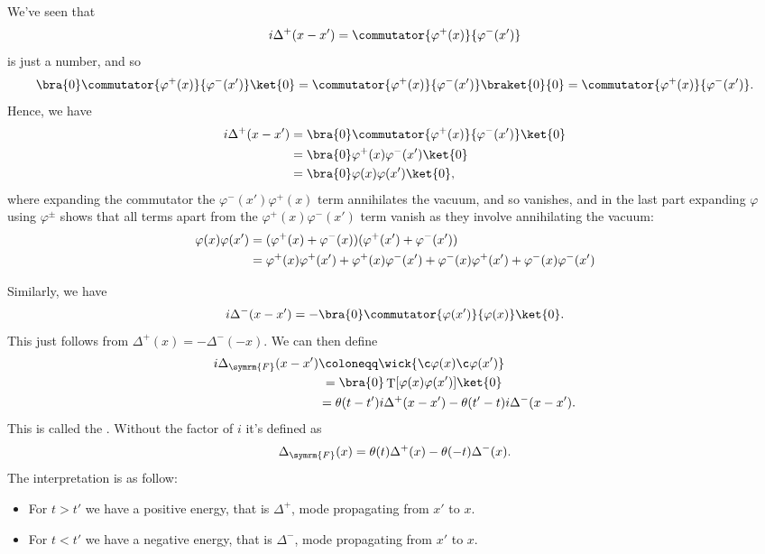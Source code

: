 \documentclass[fleqn]{NotesClass}
\newcommand{\heaviside}{\theta}
\DeclareMathOperator{\timeOrdering}{T}
\newcommand{\feynman}{\symrm{F}}
\begin{document}
    We've seen that
    \begin{equation}
        i\Delta^+(x - x') = \commutator{\varphi^+(x)}{\varphi^-(x')}
    \end{equation}
    is just a number, and so
    \begin{equation}
        \bra{0} \commutator{\varphi^+(x)}{\varphi^-(x')} \ket{0} = \commutator{\varphi^+(x)}{\varphi^-(x')} \braket{0}{0} = \commutator{\varphi^+(x)}{\varphi^-(x')}.
    \end{equation}
    Hence, we have
    \begin{align}
        i\Delta^+(x - x') &= \bra{0} \commutator{\varphi^+(x)}{\varphi^-(x')} \ket{0}\\
        &= \bra{0} \varphi^+(x)\varphi^-(x') \ket{0}\\
        &= \bra{0} \varphi(x) \varphi(x') \ket{0},
    \end{align}
    where expanding the commutator the \(\varphi^-(x')\varphi^+(x)\) term annihilates the vacuum, and so vanishes, and in the last part expanding \(\varphi\) using \(\varphi^{\pm}\) shows that all terms apart from the \(\varphi^+(x)\varphi^-(x')\) term vanish as they involve annihilating the vacuum:
    \begin{align}
        \varphi(x)\varphi(x') &= (\varphi^+(x) + \varphi^-(x))(\varphi^+(x') + \varphi^-(x'))\\
        &= \varphi^+(x)\varphi^+(x') + \varphi^+(x)\varphi^-(x') + \varphi^-(x)\varphi^+(x') + \varphi^-(x)\varphi^-(x') \notag
    \end{align}
    
    Similarly, we have
    \begin{equation}
        i\Delta^-(x - x') = -\bra{0} \commutator{\varphi(x')}{\varphi(x)}\ket{0}.
    \end{equation}
    This just follows from \(\Delta^+(x) = -\Delta^-(-x)\).
    We can then define
    \begin{align}
        i\Delta_{\feynman} (x - x') &\coloneqq \wick{\c \varphi(x) \c \varphi(x')}\\
        &\hphantom{:}= \bra{0} \timeOrdering[\varphi(x)\varphi(x')]\ket{0}\\
        &= \heaviside(t - t') i\Delta^+(x - x') - \heaviside(t' - t)i\Delta^-(x - x').
    \end{align}
    This is called the .
    Without the factor of \(i\) it's defined as
    \begin{equation}
        \Delta_{\feynman}(x) = \heaviside(t)\Delta^+(x) - \heaviside(-t)\Delta^-(x).
    \end{equation}
    The interpretation is as follow:
    \begin{itemize}
        \item For \(t > t'\) we have a positive energy, that is \(\Delta^+\), mode propagating from \(x'\) to \(x\).
        \item For \(t < t'\) we have a negative energy, that is \(\Delta^-\), mode propagating from \(x'\)  to \(x\).
    \end{itemize}
    
\end{document}
